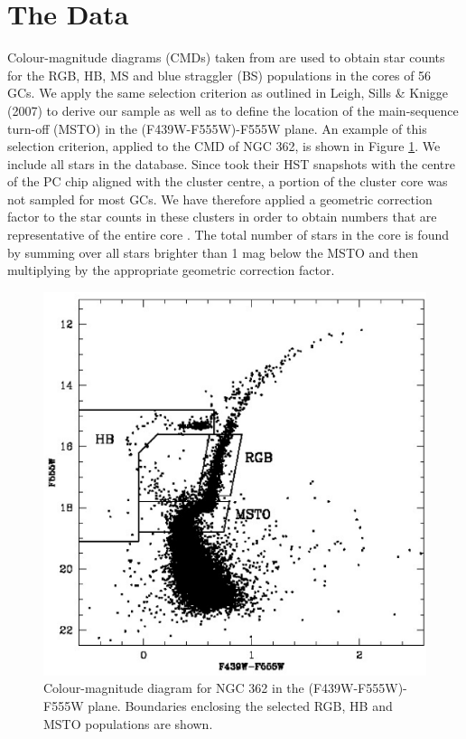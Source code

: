 \section{The Data} \label{data3}

Colour-magnitude diagrams (CMDs) taken from \citet{piotto02} are used to
obtain star counts for the RGB, HB, MS and blue straggler (BS)
populations in the cores of 56 GCs.  We apply the same selection 
criterion as outlined in Leigh, Sills \& Knigge (2007) to derive our
sample as well as to define the location of the main-sequence turn-off
(MSTO) in the (F439W-F555W)-F555W plane.  An example of this selection
criterion, applied to the 
CMD of NGC 362, is shown in Figure \ref{fig:ngc0362_labels}.  We
include all stars in the \citet{piotto02} database.  Since
\citet{piotto02} took their HST snapshots with the centre of the PC
chip aligned with the cluster centre, a portion of the cluster core
was not sampled for most GCs.  We have therefore applied a geometric
correction factor to the star counts in these clusters in order to
obtain numbers that are representative of the entire core
\citep{leigh07, leigh08}.  The total number of stars in the core is
found by summing over all stars brighter than 1 mag below the
MSTO and then multiplying by the appropriate geometric correction factor.

\begin{figure} [!h]
  \begin{center}
 \includegraphics[scale=0.5]{Chapter-3/fig1.eps}
    \caption{Colour-magnitude diagram for
  NGC 362 in the (F439W-F555W)-F555W plane.  Boundaries enclosing the
  selected RGB, HB and MSTO populations are shown.  
    \label{fig:ngc0362_labels}}
  \end{center}
\end{figure}  

